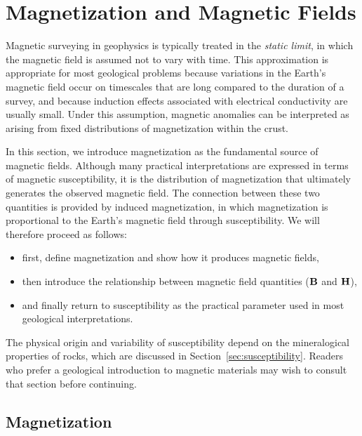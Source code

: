 \section{Magnetization and Magnetic Fields}

Magnetic surveying in geophysics is typically treated in the \emph{static limit}, in which the magnetic field is assumed not to vary with time. This approximation is appropriate for most geological problems because variations in the Earth's magnetic field occur on timescales that are long compared to the duration of a survey, and because induction effects associated with electrical conductivity are usually small. Under this assumption, magnetic anomalies can be interpreted as arising from fixed distributions of magnetization within the crust.

In this section, we introduce magnetization as the fundamental source of magnetic fields. Although many practical interpretations are expressed in terms of magnetic susceptibility, it is the distribution of magnetization that ultimately generates the observed magnetic field.  The connection between these two quantities is provided by induced magnetization, in which magnetization is proportional to the Earth's magnetic field through susceptibility. We will therefore proceed as follows:
\begin{itemize}
    \item first, define magnetization and show how it produces magnetic fields,
    \item then introduce the relationship between magnetic field quantities ($\vb{B}$ and $\vb{H}$),
    \item and finally return to susceptibility as the practical parameter used in most geological interpretations.
\end{itemize}
The physical origin and variability of susceptibility depend on the mineralogical properties of rocks, which are discussed in Section~\ref{sec:susceptibility}. Readers who prefer a geological introduction to magnetic materials may wish to consult that section before continuing.

\subsection{Magnetization}

